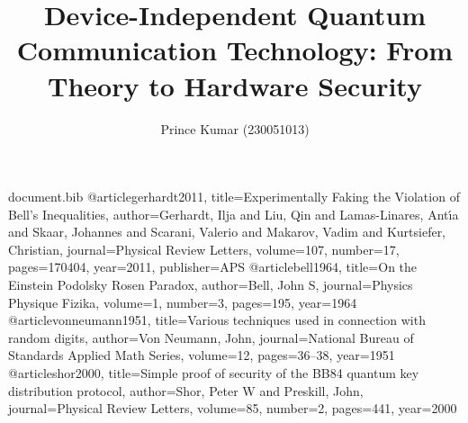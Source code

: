 \begin{filecontents*}{document.bib}
@article{gerhardt2011,
  title={Experimentally Faking the Violation of Bell’s Inequalities},
  author={Gerhardt, Ilja and Liu, Qin and Lamas-Linares, Ant{\'\i}a and Skaar, Johannes and Scarani, Valerio and Makarov, Vadim and Kurtsiefer, Christian},
  journal={Physical Review Letters},
  volume={107},
  number={17},
  pages={170404},
  year={2011},
  publisher={APS}
}
@article{bell1964,
  title={On the Einstein Podolsky Rosen Paradox},
  author={Bell, John S},
  journal={Physics Physique Fizika},
  volume={1},
  number={3},
  pages={195},
  year={1964}
}
@article{vonneumann1951,
  title={Various techniques used in connection with random digits},
  author={Von Neumann, John},
  journal={National Bureau of Standards Applied Math Series},
  volume={12},
  pages={36--38},
  year={1951}
}
@article{shor2000,
  title={Simple proof of security of the BB84 quantum key distribution protocol},
  author={Shor, Peter W and Preskill, John},
  journal={Physical Review Letters},
  volume={85},
  number={2},
  pages={441},
  year={2000}
}
\end{filecontents*}

\documentclass[12pt,twocolumn,letterpaper,english]{article}

\usepackage[T1]{fontenc}
\usepackage[utf8]{inputenc} 
\usepackage[margin=1.75cm,columnsep=0.75cm,headheight=26pt,includeheadfoot]{geometry}
\usepackage[english]{babel}
\usepackage{listings}
\usepackage{color}
\usepackage{titlesec}
\usepackage{titling}
\usepackage{changepage}
\usepackage{amsmath}
\usepackage[colorlinks=true, linkcolor=red, urlcolor=blue, citecolor=blue]{hyperref}
\usepackage{enumitem}
\usepackage{graphicx}
\usepackage{fancyhdr}
\usepackage{lastpage}
\usepackage{caption}
\usepackage{tocloft}
\usepackage{setspace}
\usepackage{multirow}
\usepackage{float}
\usepackage{booktabs}
\usepackage{indentfirst}
\usepackage{xcolor}
\usepackage{csquotes}
\usepackage{amssymb}
\usepackage{pdfpages}

\newcommand{\Title}{Device-Independent Quantum Communication Technology: From Theory to Hardware Security}
\title{\Title}
\author{Prince Kumar (230051013)}

\pagestyle{fancy}
\fancyhf{}
\cfoot{\thepage}

\titleformat{\section}{\large\bfseries\sffamily\raggedright}{\thesection}{1em}{}
\titleformat{\subsection}{\normalsize\bfseries\sffamily\raggedright}{\thesubsection}{1em}{}




